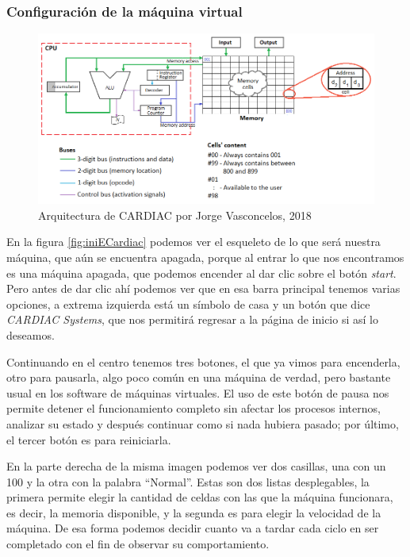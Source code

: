 \documentclass[letterpaper,12pt,oneside]{book}
\begin{document}
    \subsubsection{Configuración de la máquina virtual}
    
	\begin{figure}[h]
 			\centering
			\includegraphics[scale=0.5]{media/ECARDIAC/arq_cardiac.png}
			\caption{Arquitectura de CARDIAC por Jorge Vasconcelos, 2018}
			\label{fig:arqCardiac}
	\end{figure}	
	
	En la figura \ref{fig:iniECardiac} podemos ver el esqueleto de lo que será nuestra máquina, que aún se encuentra apagada, porque al entrar
	lo que nos encontramos es una máquina apagada, que podemos encender al dar clic sobre el botón \textit{start}. Pero antes de dar clic ahí podemos
	ver que en esa barra principal tenemos varias opciones, a extrema izquierda está un símbolo de casa y un botón que dice \textit{CARDIAC Systems}, que
	nos permitirá regresar a la página de inicio si así lo deseamos.
 
    Continuando en el centro tenemos tres botones, el que ya vimos para encenderla, otro para pausarla, algo poco común en una máquina de verdad, pero bastante usual en los software de máquinas virtuales. El uso de este botón de pausa
	nos permite detener el funcionamiento completo sin afectar los procesos internos, analizar su estado
	y después continuar como si nada hubiera pasado; por último, el tercer botón es para reiniciarla.
	
	En la
	parte derecha de la misma imagen podemos ver dos casillas, una con un 100 y la otra con la palabra ``Normal''. Estas son dos listas desplegables, la primera permite 
	elegir la cantidad de celdas con las que la máquina funcionara, es decir, la memoria disponible, y la segunda es para elegir la velocidad de la máquina. De esa
	forma podemos decidir cuanto va a tardar cada ciclo en ser completado con el fin de observar su comportamiento.
 
\end{document}
